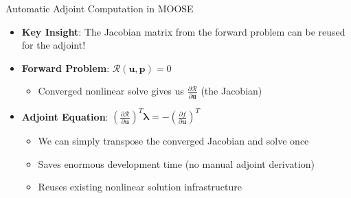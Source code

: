 \documentclass[10pt,aspectratio=169]{beamer}
\begin{document}
\begin{frame}{Automatic Adjoint Computation in MOOSE}
    \begin{itemize}
        \item \textbf{Key Insight}: The Jacobian matrix from the forward problem can be reused for the adjoint!
        
        \item \textbf{Forward Problem}: $\mathcal{R}(\mathbf{u}, \mathbf{p}) = 0$
        \begin{itemize}
            \item Converged nonlinear solve gives us $\frac{\partial \mathcal{R}}{\partial \mathbf{u}}$ (the Jacobian)
        \end{itemize}
        
        \item \textbf{Adjoint Equation}: $\left(\frac{\partial \mathcal{R}}{\partial \mathbf{u}}\right)^T \boldsymbol{\lambda} = -\left(\frac{\partial f}{\partial \mathbf{u}}\right)^T$
        \begin{itemize}
            \item We can simply transpose the converged Jacobian and solve once
            \item Saves enormous development time (no manual adjoint derivation)
            \item Reuses existing nonlinear solution infrastructure
        \end{itemize}
        
      
    \end{itemize}
\end{frame}
\end{document}
